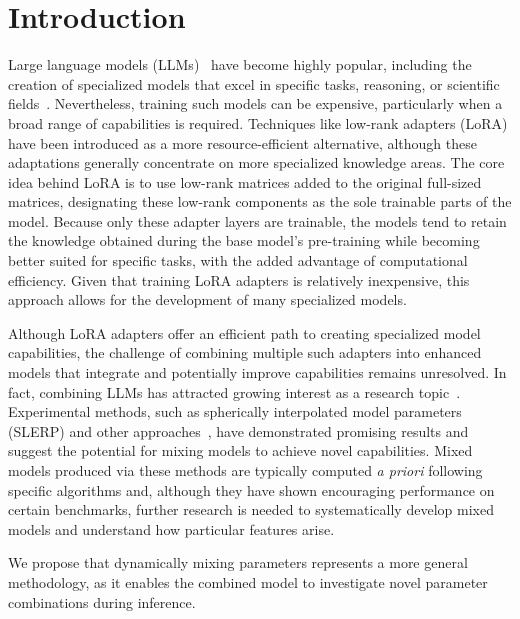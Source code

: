 \section{Introduction}
Large language models (LLMs)~\cite{Vaswani2017AttentionNeedc,Touvron2023LlamaModels,OpenAI2023GPT-4Report,Chowdhery2022PaLM:Pathways,Jiang2023Mistral7B,Gunasekar2023TextbooksNeed} have become highly popular, including the creation of specialized models that excel in specific tasks, reasoning, or scientific fields~\cite{Bubeck2023SparksGPT-4,Buehler2023MechGPTModalities,Nejjar2023LLMsAnalysis,Buehler2023GenerativeDesign,Luu2023BioinspiredLLM:Materials,Luu2023GenerativeSolvents,Buehler2023MeLMProblemsb,Ge2023OpenAGI:Experts}. Nevertheless, training such models can be expensive, particularly when a broad range of capabilities is required. Techniques like low-rank adapters (LoRA) \cite{hu2021lora} have been introduced as a more resource-efficient alternative, although these adaptations generally concentrate on more specialized knowledge areas. The core idea behind LoRA is to use low-rank matrices added to the original full-sized matrices, designating these low-rank components as the sole trainable parts of the model. Because only these adapter layers are trainable, the models tend to retain the knowledge obtained during the base model’s pre-training while becoming better suited for specific tasks, with the added advantage of computational efficiency. Given that training LoRA adapters is relatively inexpensive, this approach allows for the development of many specialized models.

Although LoRA adapters offer an efficient path to creating specialized model capabilities, the challenge of combining multiple such adapters into enhanced models that integrate and potentially improve capabilities remains unresolved. In fact, combining LLMs has attracted growing interest as a research topic~\cite{Kim2023SOLARUp-Scaling}. Experimental methods, such as spherically interpolated model parameters (SLERP) and other approaches~\cite{Arcee-ai/mergekit:Models.}, have demonstrated promising results and suggest the potential for mixing models to achieve novel capabilities. Mixed models produced via these methods are typically computed {\it a priori} following specific algorithms and, although they have shown encouraging performance on certain benchmarks, further research is needed to systematically develop mixed models and understand how particular features arise.

We propose that dynamically mixing parameters represents a more general methodology, as it enables the combined model to investigate novel parameter combinations during inference.

